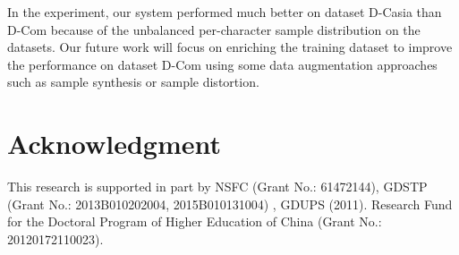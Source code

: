 \documentclass[10pt,conference,a4paper]{IEEEtran}
\begin{document}

In the experiment, our system performed much better on dataset D-Casia than D-Com because of the unbalanced per-character sample distribution on the datasets. Our future work will focus on enriching the training dataset to improve the performance on dataset D-Com using some data augmentation approaches such as sample synthesis or sample distortion.




\section*{Acknowledgment}
This research is supported in part by NSFC (Grant No.: 61472144), GDSTP (Grant No.: 2013B010202004, 2015B010131004) , GDUPS (2011). Research Fund for the Doctoral Program of Higher Education of China (Grant No.: 20120172110023).



\end{document}
